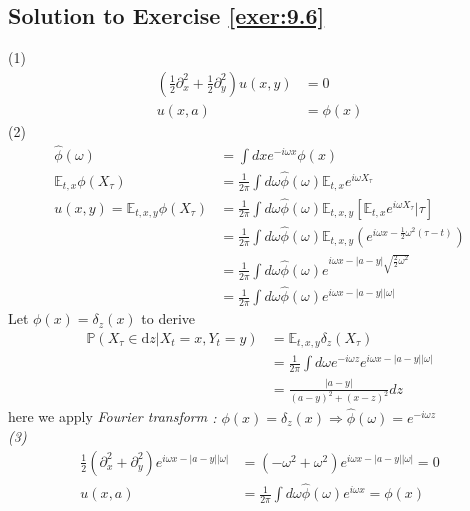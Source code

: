\documentclass[12pt]{book}
\numberwithin{equation}{chapter}
\theoremstyle{plain}
\numberwithin{theorem}{section}
\theoremstyle{definition}
\numberwithin{exercise}{chapter}
\newcommand{\<}{\langle}
\renewcommand{\>}{\rangle}
\renewcommand{\(}{\left(}
\renewcommand{\)}{\right)}
\renewcommand{\[}{\left[}
\renewcommand{\]}{\right]}
\newcommand\Eb{\mathds{E}}
\newcommand\Pb{\mathds{P}}
\newcommand\om{\omega}
\newcommand\dd{\mathrm{d}}
\begin{document}
\subsection*{Solution to Exercise \ref{exer:9.6}}
(1)
\begin{align}
(\frac{1}{2} \partial^2_x + \frac{1}{2}\partial^2_y ) u(x,y) &=0 \\
u(x,a) &=\phi(x)
\end{align}
(2)
\begin{align}
 \widehat{\phi}(\om) &= \int dx e^{-i\om x}\phi(x)\\
 \Eb_{t,x} \phi(X_\tau) &= \frac{1}{2 \pi} \int d\om \widehat{\phi}(\om) \Eb_{t,x}e^{i\om X_\tau}\\
u(x,y) = \Eb_{t,x,y}\phi(X_\tau) &= \frac{1}{2\pi} \int d\om \widehat{\phi }(\om) \Eb_{t,x,y}[ \Eb_{t,x}e^{i\om X_\tau} | \tau]\\
     &=\frac{1}{2\pi} \int d\om \widehat{\phi} (\om)\Eb_{t,x,y}(e^{i\om x - \frac{1}{2} \om^2 (\tau -t)  })\\
     &= \frac{1}{2\pi} \int d\om \widehat{\phi }(\om) e^{i\om x - |a-y| \sqrt{\frac{2}{2} \om^2}}\\
     &=  \frac{1}{2\pi} \int d\om \widehat{\phi }(\om) e^{i\om x - |a-y| |\om|}
\end{align}
Let $\phi(x) = \delta_z(x)$ to derive 
\begin{align}
\Pb(X_\tau \in \dd z | X_t=x, Y_t= y) &=  \Eb_{t,x,y}\delta_z(X_\tau)\\
  &=     \frac{1}{2\pi} \int d\om e^{-i\om z} e^{i\om x - |a-y| |\om|} \\ 
  &= \frac{|a-y|}{(a-y)^2 + (x-z)^2}dz 
\end{align}
here we apply \em Fourier transform  \em: $\phi(x)=\delta_z(x) \Rightarrow \widehat{\phi}(\om) = e^{-i\om z}$ 
\\
(3)
\begin{align}
\frac{1}{2}(\partial^2_x + \partial^2_y) e^{i\om x - |a-y| |\om|}&= (-\om^2 + \om^2)e^{i\om x - |a-y| |\om|} = 0\\
 u(x,a) &=  \frac{1}{2\pi} \int d\om \widehat{\phi }(\om) e^{i\om x}
 =\phi(x)  
\end{align}
\end{document}
